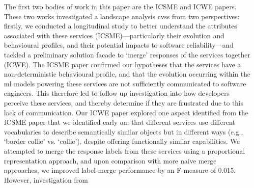 The first two bodies of work in this paper are the ICSME and ICWE papers. These two works investigated a landscape analysis \glspl{cvs} from two perspectives: firstly, we conducted a longitudinal study to better understand the attributes associated with these services (ICSME)---particularly their evolution and behavioural profiles, and their potential impacts to software reliability---and tackled a preliminary solution facade to `merge' responses of the services together (ICWE). The ICSME paper confirmed our hypotheses that the services have a non-deterministic behavioural profile, and that the evolution occurring within the \gls{ml} models powering these services are not sufficiently communicated to software engineers. This therefore led to follow up investigation into how developers perceive these services, and thereby determine if they are frustrated due to this lack of communication. Our ICWE paper explored one aspect identified from the ICSME paper that we identified early on: that different services use different vocabularies to describe semantically similar objects but in different ways (e.g., `border collie' vs. `collie'), despite offering functionally similar capabilities. We attempted to merge the response labels from these services using a proportional representation approach, and upon comparison with more naive merge approaches, we improved label-merge performance by an F-measure of 0.015. However, investigation from 

